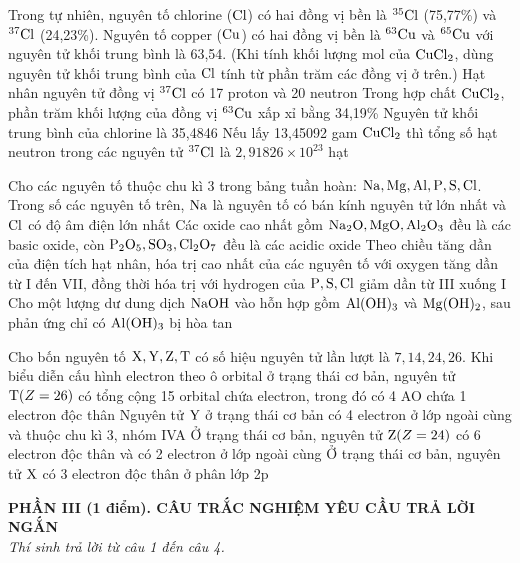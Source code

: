 \documentclass[11pt,a4paper]{article}
\begin{document}
\begin{ex}
Trong tự nhiên, nguyên tố chlorine ($\ce{Cl}$) có hai đồng vị bền là $^{35}\ce{Cl}$ (75,77\%) và $^{37}\ce{Cl}$ (24,23\%). Nguyên tố copper ($\ce{Cu}$) có hai đồng vị bền là $^{63}\ce{Cu}$ và $^{65}\ce{Cu}$ với nguyên tử khối trung bình là 63,54. (Khi tính khối lượng mol của $\ce{CuCl2}$, dùng nguyên tử khối trung bình của $\ce{Cl}$ tính từ phần trăm các đồng vị ở trên.)
\choiceTF
{\True Hạt nhân nguyên tử đồng vị $^{37}\ce{Cl}$ có 17 proton và 20 neutron}
{\True Trong hợp chất $\ce{CuCl2}$, phần trăm khối lượng của đồng vị $^{63}\ce{Cu}$ xấp xỉ bằng 34,19\%}
{\True Nguyên tử khối trung bình của chlorine là 35,4846}
{Nếu lấy 13,45092 gam $\ce{CuCl2}$ thì tổng số hạt neutron trong các nguyên tử $^{37}\ce{Cl}$ là $2,91826 \times 10^{23}$ hạt}
\end{ex}
\begin{ex}
Cho các nguyên tố thuộc chu kì 3 trong bảng tuần hoàn: $\ce{Na, Mg, Al, P, S, Cl}$.
\choiceTF
{\True Trong số các nguyên tố trên, $\ce{Na}$ là nguyên tố có bán kính nguyên tử lớn nhất và $\ce{Cl}$ có độ âm điện lớn nhất}
{Các oxide cao nhất gồm $\ce{Na2O, MgO, Al2O3}$ đều là các basic oxide, còn $\ce{P2O5, SO3, Cl2O7}$ đều là các acidic oxide}
{\True Theo chiều tăng dần của điện tích hạt nhân, hóa trị cao nhất của các nguyên tố với oxygen tăng dần từ I đến VII, đồng thời hóa trị với hydrogen của $\ce{P, S, Cl}$ giảm dần từ III xuống I}
{\True Cho một lượng dư dung dịch $\ce{NaOH}$ vào hỗn hợp gồm $\ce{Al(OH)3}$ và $\ce{Mg(OH)2}$, sau phản ứng chỉ có $\ce{Al(OH)3}$ bị hòa tan}
\end{ex}
\begin{ex}
Cho bốn nguyên tố $\ce{X, Y, Z, T}$ có số hiệu nguyên tử lần lượt là $7, 14, 24, 26$.
\choiceTF
{\True Khi biểu diễn cấu hình electron theo ô orbital ở trạng thái cơ bản, nguyên tử $\ce{T} (Z = 26)$ có tổng cộng 15 orbital chứa electron, trong đó có 4 AO chứa 1 electron độc thân}
{\True Nguyên tử $\ce{Y}$ ở trạng thái cơ bản có 4 electron ở lớp ngoài cùng và thuộc chu kì 3, nhóm IVA}
{Ở trạng thái cơ bản, nguyên tử $\ce{Z} (Z = 24)$ có 6 electron độc thân và có 2 electron ở lớp ngoài cùng}
{\True Ở trạng thái cơ bản, nguyên tử $\ce{X}$ có 3 electron độc thân ở phân lớp 2p}
\end{ex}
\vspace{4pt}
\noindent
{\color{mainGreen}\textbf{\large PHẦN III (1 điểm). CÂU TRẮC NGHIỆM YÊU CẦU TRẢ LỜI NGẮN}}\\
\textit{\small Thí sinh trả lời từ câu 1 đến câu 4.}
\vspace{2pt}
\end{document}

